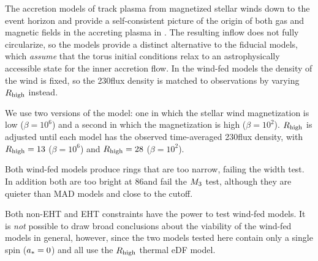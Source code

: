 The accretion models of \cite{2020ApJ...896L...6R, 2020MNRAS.492.3272R, 2018MNRAS.478.3544R} track plasma from  magnetized stellar winds down to the event horizon and provide a self-consistent picture of the origin of both gas and magnetic fields in the accreting plasma in \sgra.
The resulting inflow does not fully circularize, so the models provide a distinct alternative to the fiducial models, which {\em assume} that the torus initial conditions relax to an astrophysically accessible state for the inner accretion flow.
In the wind-fed models the density of the wind is fixed, so the 230\GHz flux density is matched to observations by varying $R_\mathrm{high}$ instead.

We use two versions of the model: one in which the stellar wind magnetization is low ($\beta = 10^6$) and a second in which the magnetization is high ($\beta = 10^2$).
$R_\mathrm{high}$ is adjusted until each model has the observed time-averaged 230\GHz flux density, with $R_\mathrm{high} = 13$ ($\beta = 10^6$) and $R_\mathrm{high} = 28$ ($\beta = 10^2$).

Both wind-fed models produce rings that are too narrow, failing the \mring width test.
In addition both are too bright at 86\GHz and fail the $M_{3}$ test, although they are quieter than MAD models and close to the cutoff.

Both non-EHT and EHT constraints have the power to test wind-fed models.
It is {\em not} possible to draw broad conclusions about the viability of the wind-fed models in general, however, since the two models tested here contain only a single spin ($a_*=0$) and all use the $R_\mathrm{high}$ thermal eDF model.

